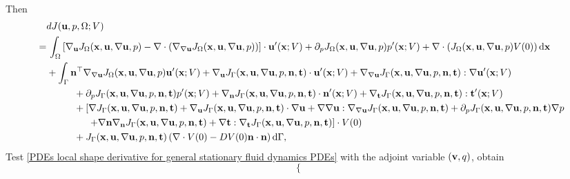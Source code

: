 \documentclass[oneside]{book}
\numberwithin{equation}{section}
\begin{document}
\begin{enumerate}[leftmargin=0in]
\begin{align*}
    \end{align*}
    Then
    \begin{align*}
        &dJ({\bf u},p,\Omega;V)\\
        =&\, \int_\Omega \left[\nabla_{\bf u}J_\Omega({\bf x},{\bf u},\nabla{\bf u},p) - \nabla\cdot(\nabla_{\nabla{\bf u}}J_\Omega({\bf x},{\bf u},\nabla{\bf u},p))\right]\cdot{\bf u}'({\bf x};V) + \partial_pJ_\Omega({\bf x},{\bf u},\nabla{\bf u},p)p'({\bf x};V) + \nabla\cdot\left(J_\Omega({\bf x},{\bf u},\nabla{\bf u},p)V(0)\right){\rm d}{\bf x}\\
        &+ \int_\Gamma {\bf n}^\top\nabla_{\nabla{\bf u}}J_\Omega({\bf x},{\bf u},\nabla{\bf u},p){\bf u}'({\bf x};V) + \nabla_{\bf u}J_\Gamma({\bf x},{\bf u},\nabla{\bf u},p,{\bf n},{\bf t})\cdot{\bf u}'({\bf x};V) + \nabla_{\nabla{\bf u}}J_\Gamma({\bf x},{\bf u},\nabla{\bf u},p,{\bf n},{\bf t}):\nabla{\bf u}'({\bf x};V)\\
        &\hspace{1cm}+ \partial_pJ_\Gamma({\bf x},{\bf u},\nabla{\bf u},p,{\bf n},{\bf t})p'({\bf x};V) + \nabla_{\bf n}J_\Gamma({\bf x},{\bf u},\nabla{\bf u},p,{\bf n},{\bf t})\cdot{\bf n}'({\bf x};V) + \nabla_{\bf t}J_\Gamma({\bf x},{\bf u},\nabla{\bf u},p,{\bf n},{\bf t}):{\bf t}'({\bf x};V)\\
        &\hspace{1cm}+ \left[\nabla J_\Gamma({\bf x},{\bf u},\nabla{\bf u},p,{\bf n},{\bf t}) + \nabla_{\bf u}J_\Gamma({\bf x},{\bf u},\nabla{\bf u},p,{\bf n},{\bf t})\cdot\nabla{\bf u} + \nabla\nabla{\bf u}:\nabla_{\nabla{\bf u}}J_\Gamma({\bf x},{\bf u},\nabla{\bf u},p,{\bf n},{\bf t}) + \partial_pJ_\Gamma({\bf x},{\bf u},\nabla{\bf u},p,{\bf n},{\bf t})\nabla p\right.\\
        &\hspace{15mm} \left.+ \nabla{\bf n}\nabla_{\bf n}J_\Gamma({\bf x},{\bf u},\nabla{\bf u},p,{\bf n},{\bf t}) + \nabla{\bf t}:\nabla_{\bf t}J_\Gamma({\bf x},{\bf u},\nabla{\bf u},p,{\bf n},{\bf t})\right]\cdot V(0)\\
        &\hspace{1cm}+ J_\Gamma({\bf x},{\bf u},\nabla{\bf u},p,{\bf n},{\bf t})\left(\nabla\cdot V(0) - DV(0){\bf n}\cdot{\bf n}\right){\rm d}\Gamma,
    \end{align*}
    Test \eqref{PDEs local shape derivative for general stationary fluid dynamics PDEs} with the adjoint variable $({\bf v},q)$, obtain
    \begin{equation*}
        \left\{\begin{split}

\end{split}
\end{equation*}
\end{enumerate}
\end{document}
